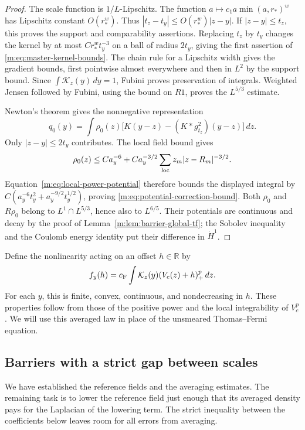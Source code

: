 \begin{proof}
The scale function is $1/L$-Lipschitz.  The function
$a\mapsto c_1a\min(a,r_*)^w$ has Lipschitz constant $O(r_*^w)$.
Thus $|t_z-t_y|\le O(r_*^w)|z-y|$.  If $|z-y|\le t_z$, this proves
the support and comparability assertions.  Replacing $t_z$ by $t_y$
changes the kernel by at most $Cr_*^wt_y^{-3}$ on a ball of radius
$2t_y$, giving the first assertion of \eqref{m:eq:master-kernel-bounds}.
The chain rule for a Lipschitz width gives the gradient bounds, first
pointwise almost everywhere and then in $L^2$ by the support bound.
Since $\int\mathcal K_z(y)\,dy=1$, Fubini proves preservation of
integrals.  Weighted Jensen followed by Fubini, using the bound on
$R1$, proves the $L^{5/3}$ estimate.

Newton's theorem gives the nonnegative representation
\[
 q_0(y)=\int\rho_0(z)
   \bigl[K(y-z)-(K*g_{t_z}^2)(y-z)\bigr]\,dz.
\]
Only $|z-y|\le2t_y$ contributes.  The local field bound gives
\[
 \rho_0(z)\le Ca_y^{-6}
    +Ca_y^{-3/2}\sum_{\rm loc}z_m|z-R_m|^{-3/2}.
\]
Equation~\eqref{m:eq:local-power-potential} therefore bounds the displayed
integral by
$C(a_y^{-6}t_y^2+a_y^{-9/2}t_y^{1/2})$, proving
\eqref{m:eq:potential-correction-bound}.  Both $\rho_0$ and $R\rho_0$
belong to $L^1\cap L^{5/3}$, hence also to $L^{6/5}$.  Their potentials
are continuous and decay by the proof of Lemma~\ref{m:lem:barrier-global-tf};
the Sobolev inequality and the Coulomb energy identity put their
difference in $\dot H^1$.
\end{proof}

Define the nonlinearity acting on an offset $h\in\mathbb R$ by
\begin{equation}\label{m:eq:offset-reaction}
 f_y(h)=c_{\mathrm F}\int\mathcal K_z(y)(V_c(z)+h)_+^p\,dz.
\end{equation}
For each $y$, this is finite, convex, continuous, and nondecreasing in
$h$.  These properties follow from those of the positive power and the
local integrability of $V_c^p$.  We will use this averaged law in place
of the unsmeared Thomas--Fermi equation.

\subsection{Barriers with a strict gap between scales}

We have established the reference fields and the averaging estimates.
The remaining task is to lower the reference field just enough that its
averaged density pays for the Laplacian of the lowering term.  The
strict inequality between the coefficients below leaves room for all
errors from averaging.

